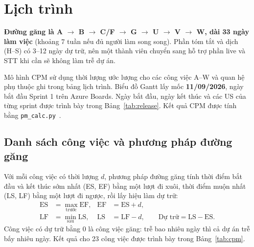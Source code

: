\documentclass[12pt,a4paper]{report}
\begin{document}
\chapter{Lịch trình}
\label{chap:schedule}

\textbf{Đường găng là A $\rightarrow$ B $\rightarrow$ C/F $\rightarrow$ G $\rightarrow$ U $\rightarrow$ V
$\rightarrow$ W, dài 33 ngày làm việc} (khoảng 7 tuần nếu đủ người làm song song). Phần tóm tắt và dịch (H--S) có
3--12 ngày dự trữ, nên một thành viên chuyển sang hỗ trợ phần live và STT khi cần sẽ không làm trễ dự án.

Mô hình CPM sử dụng thời lượng ước lượng cho các công việc A--W và quan hệ phụ thuộc ghi trong bảng lịch trình.
Biểu đồ Gantt lấy mốc \textbf{11/09/2026}, ngày bắt đầu Sprint 1 trên Azure Boards. Ngày bắt đầu, ngày kết thúc
và các US của từng sprint được trình bày trong Bảng~\ref{tab:release}. Kết quả CPM được tính bằng
\texttt{pm\_calc.py}~\cite{pmcalc}.

\section{Danh sách công việc và phương pháp đường găng}

Với mỗi công việc có thời lượng $d$, phương pháp đường găng tính thời điểm bắt đầu và kết thúc sớm nhất (ES, EF)
bằng một lượt đi xuôi, thời điểm muộn nhất (LS, LF) bằng một lượt đi ngược, rồi lấy hiệu làm dự trữ:
\begin{equation}
  \label{eq:cpm}
  \begin{aligned}
    \mathrm{ES} &= \max_{\text{trước}} \mathrm{EF}, & \mathrm{EF} &= \mathrm{ES} + d, \\
    \mathrm{LF} &= \min_{\text{sau}} \mathrm{LS}, & \mathrm{LS} &= \mathrm{LF} - d, \qquad
    \text{Dự trữ} = \mathrm{LS} - \mathrm{ES}.
  \end{aligned}
\end{equation}
Công việc có dự trữ bằng 0 là công việc găng: trễ bao nhiêu ngày thì cả dự án trễ bấy nhiêu ngày. Kết quả cho 23
công việc được trình bày trong Bảng~\ref{tab:cpm}.
\end{document}
